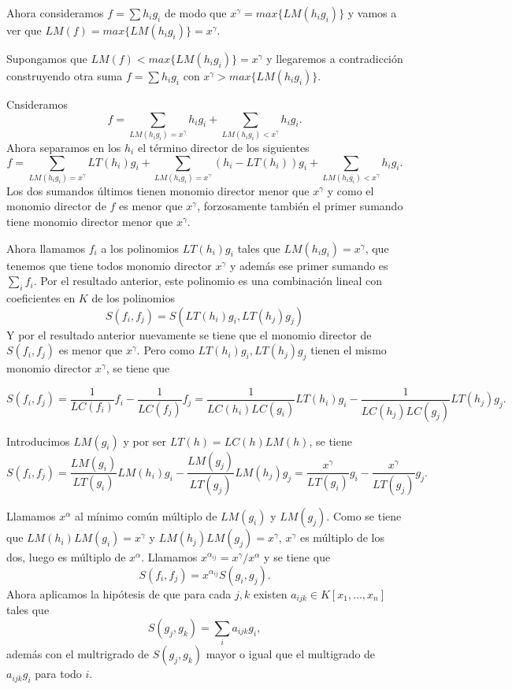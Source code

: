 \documentclass[12pt]{article}
\begin{document}
Ahora consideramos $f = \sum h_ig_i$ de modo que $x^\gamma = max \lbrace LM(h_ig_i) \rbrace$ y vamos a ver que $LM(f) = max \lbrace LM(h_ig_i) \rbrace = x^\gamma$.

Supongamos que $LM(f) < max \lbrace LM(h_ig_i) \rbrace = x^\gamma$ y llegaremos a contradicción construyendo otra suma $f= \sum h_ig_i$ con $x^\gamma > max \lbrace LM(h_ig_i) \rbrace$.

Cnsideramos $$f = \sum_{LM(h_ig_i)=x^\gamma}h_ig_i + \sum_{LM(h_ig_i)<x^\gamma}h_ig_i.$$ Ahora separamos en los $h_i$ el término director de los siguientes $$f = \sum_{LM(h_ig_i)=x^\gamma}LT(h_i)g_i + \sum_{LM(h_ig_i)=x^\gamma}(h_i -LT(h_i))g_i + \sum_{LM(h_ig_i)<x^\gamma}h_ig_i.$$
Los dos sumandos últimos tienen monomio director menor que $x^\gamma$ y como el monomio director de $f$ es menor que $x^\gamma$, forzosamente también el primer sumando tiene monomio director menor que $x^\gamma$.

Ahora llamamos $f_i$ a los polinomios $LT(h_i) g_i$ tales que $LM(h_ig_i) = x^\gamma$, que tenemos que tiene todos monomio director $x^\gamma$ y además ese primer sumando es $\sum_i f_i$. Por el resultado anterior, este polinomio es una combinación lineal con coeficientes en $K$ de los polinomios $$S(f_i, f_j) = S(LT(h_i)g_i, LT(h_j)g_j)$$ Y por el resultado anterior nuevamente se tiene que el monomio director de $S(f_i,f_j)$ es menor que $x^\gamma$. Pero como $LT(h_i)g_i, LT(h_j)g_j$ tienen el mismo monomio director $x^\gamma$, se tiene que \begin{center}$S(f_i, f_j) = \dfrac{1}{LC(f_i)}f_i - \dfrac{1}{LC(f_j)}f_j = \dfrac{1}{LC(h_i)LC(g_i)}LT(h_i)g_i- \dfrac{1}{LC(h_j)LC(g_j)} LT(h_j)g_j.$\end{center} Introducimos $LM(g_i)$ y por ser $LT(h) = LC(h) LM(h)$, se tiene $$S(f_i,f_j) = \dfrac{LM(g_i)}{LT(g_i)}LM(h_i)g_i - \dfrac{LM(g_j)}{LT(g_j)}LM(h_j)g_j = \dfrac{x^\gamma}{LT(g_i)}g_i - \dfrac{x^\gamma}{LT(g_j)}g_j.$$

Llamamos $x^\alpha$ al mínimo común múltiplo de $LM(g_i)$ y $LM(g_j)$. Como se tiene que $LM(h_i)LM(g_i) = x^\gamma$ y $LM(h_j)LM(g_j) = x^\gamma$, $x^\gamma$ es múltiplo de los dos, luego es múltiplo de $x^\alpha$. Llamamos $x^{\alpha_{ij}} = x^\gamma/x^\alpha$ y se tiene que $$S(f_i,f_j) = x^{\alpha_{ij}}S(g_i,g_j).$$ Ahora aplicamos la hipótesis de que para cada $j,k$ existen $a_{ijk} \in K[x_1, \ldots, x_n]$ tales que $$S(g_j,g_k) = \sum_i a_{ijk}g_i,$$ además con el multrigrado de $S(g_j,g_k)$ mayor o igual que el multigrado de $a_{ijk}g_i$ para todo $i$.
\end{document}
